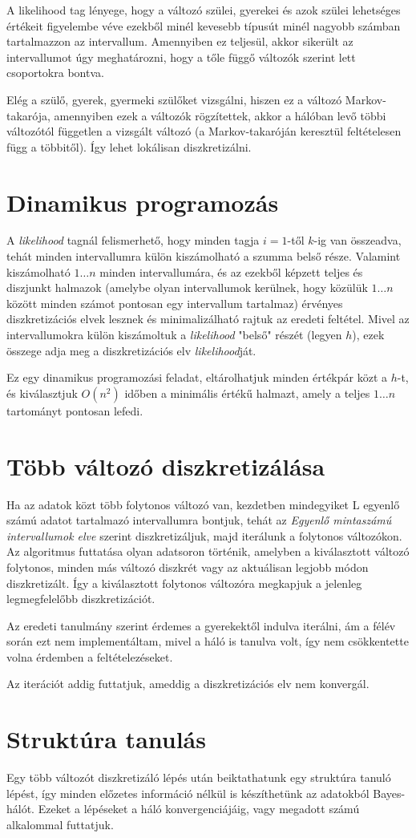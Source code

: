 A likelihood tag lényege, hogy a változó szülei, gyerekei és azok szülei lehetséges értékeit figyelembe véve ezekből minél kevesebb típusút minél nagyobb számban tartalmazzon az intervallum. Amennyiben ez teljesül, akkor sikerült az intervallumot úgy meghatározni, hogy a tőle függő változók szerint lett csoportokra bontva.

Elég a szülő, gyerek, gyermeki szülőket vizsgálni, hiszen ez a változó Markov-takarója, amennyiben ezek a változók rögzítettek, akkor a hálóban levő többi változótól független a vizsgált változó (a Markov-takaróján keresztül feltételesen függ a többitől). Így lehet lokálisan diszkretizálni.

\section{Dinamikus programozás}
A \textit{likelihood} tagnál felismerhető, hogy minden tagja $i=1$-től $k$-ig van összeadva, tehát minden intervallumra külön kiszámolható a szumma belső része. Valamint kiszámolható $1 \dotsc n$ minden intervallumára, és az ezekből képzett teljes és diszjunkt halmazok (amelybe olyan intervallumok kerülnek, hogy közülük $1 \dotsc n$ között minden számot pontosan egy intervallum tartalmaz) érvényes diszkretizációs elvek lesznek és minimalizálható rajtuk az eredeti feltétel. Mivel az intervallumokra külön kiszámoltuk a \textit{likelihood} "belső" részét (legyen $h$), ezek összege adja meg a diszkretizációs elv \textit{likelihood}ját.

Ez egy dinamikus programozási feladat, eltárolhatjuk minden értékpár közt a $h$-t, és kiválasztjuk $O(n^2)$ időben a minimális értékű halmazt, amely a teljes $1 \dotsc n$ tartományt pontosan lefedi.

\section{Több változó diszkretizálása}
Ha az adatok közt több folytonos változó van, kezdetben mindegyiket L egyenlő számú adatot tartalmazó intervallumra bontjuk, tehát az \textit{Egyenlő mintaszámú intervallumok elve} szerint diszkretizáljuk,  majd iterálunk a folytonos változókon. Az algoritmus futtatása olyan adatsoron történik, amelyben a kiválasztott változó folytonos, minden más változó diszkrét vagy az aktuálisan legjobb módon diszkretizált. Így a kiválasztott folytonos változóra megkapjuk a jelenleg legmegfelelőbb diszkretizációt.

Az eredeti tanulmány szerint érdemes a gyerekektől indulva iterálni, ám a félév során ezt nem implementáltam, mivel a háló is tanulva volt, így nem csökkentette volna érdemben a feltételezéseket.

Az iterációt addig futtatjuk, ameddig a diszkretizációs elv nem konvergál.

\section{Struktúra tanulás}
Egy több változót diszkretizáló lépés után beiktathatunk egy struktúra tanuló lépést, így minden előzetes információ nélkül is készíthetünk az adatokból Bayes-hálót. Ezeket a lépéseket a háló konvergenciájáig, vagy megadott számú alkalommal futtatjuk.